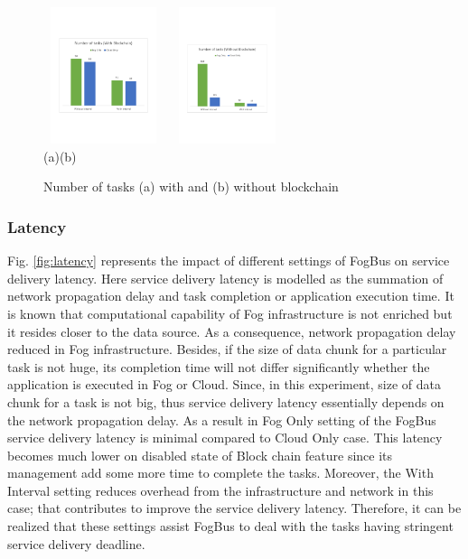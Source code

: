 \documentclass[final,5p,times,twocolumn]{elsarticle}
\begin{document}
%
\begin{figure}[h]
	\begin{center}
	\centering
		\includegraphics[width=35mm, height=40mm]{Tasks1}
		\hspace{20pt}
		\includegraphics[width=35mm, height=40mm]{Tasks2}\\
        \footnotesize{(a)\hspace{120pt}(b)}\\		 
   	\caption{Number of tasks (a) with and (b) without blockchain} \label{fig:task}
	\end{center}
\end{figure}
%
\subsubsection{Latency}
Fig. \ref{fig:latency} represents the impact of different settings of FogBus on service delivery latency. Here service delivery latency is modelled as the summation of network propagation delay and task completion or application execution time. It is known that computational capability of Fog infrastructure is not enriched but it resides closer to the data source. As a consequence, network propagation delay reduced in Fog infrastructure. Besides, if the size of data chunk for a particular task is not huge, its completion time will not differ significantly whether the application is executed in Fog or Cloud. Since, in this experiment, size of data chunk for a task is not big, thus service delivery latency essentially depends on the network propagation delay. As a result in Fog Only setting of the FogBus service delivery latency is minimal compared to Cloud Only case. This latency becomes much lower on disabled state of Block chain feature since its management add some more time to complete the tasks. Moreover, the With Interval setting reduces overhead from the infrastructure and network in this case; that contributes to improve the service delivery latency. Therefore, it can be realized that these settings assist FogBus to deal with the tasks having stringent service delivery deadline.       
 
\end{document}
